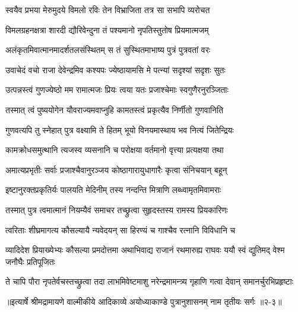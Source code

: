 \twolineshloka
{स्वयैव प्रभया मेरुमुदये विमलो रविः}
{तेन विभ्राजिता तत्र सा सभापि व्यरोचत} %

\twolineshloka
{विमलग्रहनक्षत्रा शारदी द्यौरिवेन्दुना}
{तं पश्यमानो नृपतिस्तुतोष प्रियमात्मजम्} %

\twolineshloka
{अलंकृतमिवात्मानमादर्शतलसंस्थितम्}
{स तं सुस्थितमाभाष्य पुत्रं पुत्रवतां वरः} %

\twolineshloka
{उवाचेदं वचो राजा देवेन्द्रमिव कश्यपः}
{ज्येष्ठायामसि मे पत्न्यां सदृश्यां सदृशः सुतः} %

\twolineshloka
{उत्पन्नस्त्वं गुणज्येष्ठो मम रामात्मजः प्रियः}
{त्वया यतः प्रजाश्चेमाः स्वगुणैरनुरञ्जिताः} %

\twolineshloka
{तस्मात् त्वं पुष्ययोगेन यौवराज्यमवाप्नुहि}
{कामतस्त्वं प्रकृत्यैव निर्णीतो गुणवानिति} %

\twolineshloka
{गुणवत्यपि तु स्नेहात् पुत्र वक्ष्यामि ते हितम्}
{भूयो विनयमास्थाय भव नित्यं जितेन्द्रियः} %

\twolineshloka
{कामक्रोधसमुत्थानि त्यजस्व व्यसनानि च}
{परोक्षया वर्तमानो वृत्त्या प्रत्यक्षया तथा} %

\twolineshloka
{अमात्यप्रभृतीः सर्वाः प्रजाश्चैवानुरञ्जय}
{कोष्ठागारायुधागारैः कृत्वा संनिचयान् बहून्} %

\twolineshloka
{इष्टानुरक्तप्रकृतिर्यः पालयति मेदिनीम्}
{तस्य नन्दन्ति मित्राणि लब्ध्वामृतमिवामराः} %

\twolineshloka
{तस्मात् पुत्र त्वमात्मानं नियम्यैवं समाचर}
{तच्छ्रुत्वा सुहृदस्तस्य रामस्य प्रियकारिणः} %

\twolineshloka
{त्वरिताः शीघ्रमागत्य कौसल्यायै न्यवेदयन्}
{सा हिरण्यं च गाश्चैव रत्नानि विविधानि च} %

\threelineshloka
{व्यादिदेश प्रियाख्येभ्यः कौसल्या प्रमदोत्तमा}
{अथाभिवाद्य राजानं रथमारुह्य राघवः}
{ययौ स्वं द्युतिमद् वेश्म जनौघैः प्रतिपूजितः} %

\twolineshloka
{ते चापि पौरा नृपतेर्वचस्तच्छ्रुत्वा तदा लाभमिवेष्टमाशु}
{नरेन्द्रमामन्त्र्य गृहाणि गत्वा देवान् समानर्चुरभिप्रहृष्टाः} %


॥इत्यार्षे श्रीमद्रामायणे वाल्मीकीये आदिकाव्ये अयोध्याकाण्डे पुत्रानुशासनम् नाम तृतीयः सर्गः ॥२-३॥
